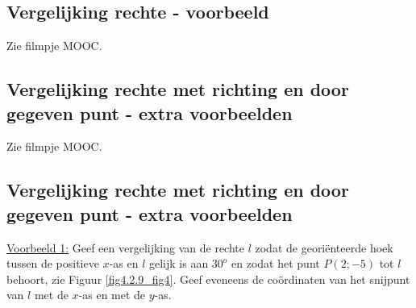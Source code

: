 %
%
%
%
%


\subsection{Vergelijking rechte - voorbeeld}
Zie filmpje MOOC.

\subsection{Vergelijking rechte met richting en door gegeven punt - extra voorbeelden}
Zie filmpje MOOC.

\subsection{Vergelijking rechte met richting en door gegeven punt - extra voorbeelden}

\noindent \underline{Voorbeeld 1:} Geef een vergelijking van de rechte $l$ zodat de geori\"enteerde hoek tussen de positieve $x$-as en $l$ gelijk is aan $30^o$ en zodat het punt $P(2;-5)$ tot  $l$ behoort, zie Figuur \ref{fig4.2.9_fig4}.
Geef eveneens de co\"ordinaten van het snijpunt van $l$ met de $x$-as en met de $y$-as.

